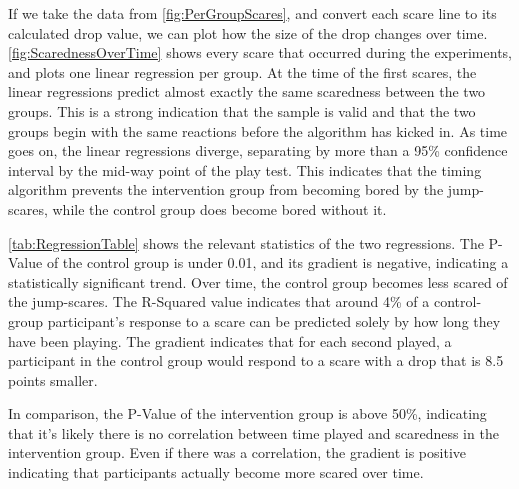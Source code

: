\documentclass[12pt,a4paper]{article}\usepackage[]{graphicx}\usepackage[]{color}
\begin{document}
If we take the data from \vref{fig:PerGroupScares}, and convert each scare line to its calculated drop value, we can plot how the size of the drop changes over time.
\vref{fig:ScarednessOverTime} shows every scare that occurred during the experiments, and plots one linear regression per group.
At the time of the first scares, the linear regressions predict almost exactly the same scaredness between the two groups.
This is a strong indication that the sample is valid and that the two groups begin with the same reactions before the algorithm has kicked in.
As time goes on, the linear regressions diverge, separating by more than a 95\% confidence interval by the mid-way point of the play test.
This indicates that the timing algorithm prevents the intervention group from becoming bored by the jump-scares, while the control group does become bored without it.

\vref{tab:RegressionTable} shows the relevant statistics of the two regressions.
The P-Value of the control group is under 0.01, and its gradient is negative, indicating a statistically significant trend.
Over time, the control group becomes less scared of the jump-scares.
The R-Squared value indicates that around 4\% of a control-group participant's response to a scare can be predicted solely by how long they have been playing.
The gradient indicates that for each second played, a participant in the control group would respond to a scare with a drop that is 8.5 points smaller.

In comparison, the P-Value of the intervention group is above 50\%, indicating that it's likely there is no correlation between time played and scaredness in the intervention group.
Even if there was a correlation, the gradient is positive indicating that participants actually become more scared over time.
\end{document}
